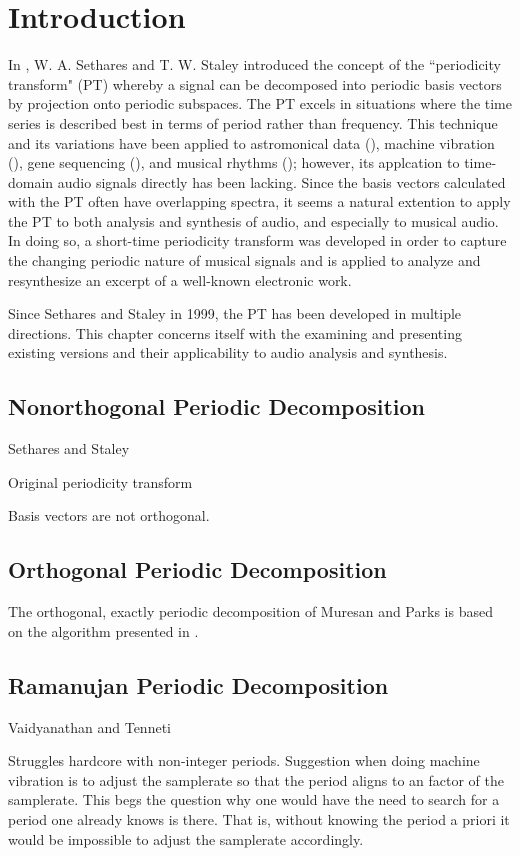 \chapter{Introduction}

In \cite{sethares1999periodicity}, W. A. Sethares and T. W. Staley introduced the concept of the ``periodicity transform" (PT) whereby a signal can be decomposed into periodic basis vectors by projection onto periodic subspaces. The PT excels in situations where the time series is described best in terms of period rather than frequency. This technique and its variations have been applied to astromonical data (\cite{buccheri1985time}), machine vibration (\cite{muresan2003orthogonal}), gene sequencing (\cite{arora2007detection}), and musical rhythms (\cite{sethares2001meter}); however, its applcation to time-domain audio signals directly has been lacking. Since the basis vectors calculated with the PT often have overlapping spectra, it seems a natural extention to apply the PT to both analysis and synthesis of audio, and especially to musical audio. In doing so, a short-time periodicity transform was developed in order to capture the changing periodic nature of musical signals and is applied to analyze and resynthesize an excerpt of a well-known electronic work.


Since Sethares and Staley in 1999, the PT has been developed in multiple directions. This chapter concerns itself with the examining and presenting existing versions and their applicability to audio analysis and synthesis.

\section{Nonorthogonal Periodic Decomposition}
Sethares and Staley

Original periodicity transform

Basis vectors are not orthogonal.

\section{Orthogonal Periodic Decomposition}

The orthogonal, exactly periodic decomposition of Muresan and Parks is based on the algorithm presented in \cite{wise1976maximum}.



\section{Ramanujan Periodic Decomposition}

Vaidyanathan and Tenneti

Struggles hardcore with non-integer periods. Suggestion when doing machine vibration is to adjust the samplerate so that the period aligns to an factor of the samplerate. This begs the question why one would have the need to search for a period one already knows is there. That is, without knowing the period a priori it would be impossible to adjust the samplerate accordingly.
